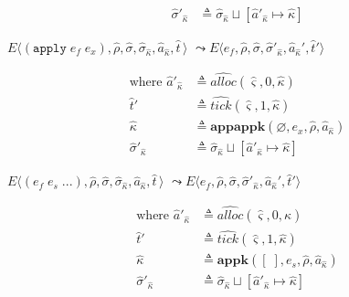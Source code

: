 \documentclass[12pt,draft]{article}
\newcommand{\applysyn}[2]{(\texttt{apply}\;#1\;#2)}
\begin{document}
{\begin{multicols*}{2}
\begin{align*}
  \hat{\sigma}'_{\hat{\kappa}} &\triangleq \hat{\sigma}_{\hat{\kappa}} \sqcup [\hat{a}'_{\hat{\kappa}} \mapsto \hat{\kappa}]
\end{align*}
\begin{center}
  $E\langle \applysyn{e_f}{e_x} , \hat{\rho} , \hat{\sigma} , \hat{\sigma}_{\hat{\kappa}} , \hat{a}_{\hat{\kappa}} , \hat{t}\,\rangle$
  $\leadsto E\langle e_f , \hat{\rho} , \hat{\sigma} , \hat{\sigma}'_{\hat{\kappa}} , \hat{a}_{\hat{\kappa}}' , \hat{t}'\rangle$
\end{center}
\vspace{-7mm}
\begin{align*}
  \text{where } \hat{a}'_{\hat{\kappa}} &\triangleq \widehat{alloc}(\hat{\varsigma}, 0, \hat{\kappa}) \\
  \hat{t}' &\triangleq \widehat{tick}(\hat{\varsigma}, 1, \hat{\kappa}) \\
  \hat{\kappa} &\triangleq \textbf{appappk}(\varnothing , e_x , \hat{\rho}, \hat{a}_{\hat{\kappa}}) \\
\hat{\sigma}'_{\hat{\kappa}} &\triangleq \hat{\sigma}_{\hat{\kappa}} \sqcup [\hat{a}'_{\hat{\kappa}} \mapsto \hat{\kappa}]
\end{align*}
\begin{center}
  $E\langle (e_f\;e_s\;...) , \hat{\rho} , \hat{\sigma} , \hat{\sigma}_{\hat{\kappa}} , \hat{a}_{\hat{\kappa}} , \hat{t}\,\rangle$
  $\leadsto E\langle e_f , \hat{\rho} , \hat{\sigma} , \hat{\sigma}'_{\hat{\kappa}} , \hat{a}_{\hat{\kappa}}' , \hat{t}'\rangle$
\end{center}
\vspace{-7mm}
\begin{align*}
  \text{where } \hat{a}'_{\hat{\kappa}} &\triangleq \widehat{alloc}(\hat{\varsigma}, 0, \hat{\kappa}) \\
  \hat{t}' &\triangleq \widehat{tick}(\hat{\varsigma}, 1, \hat{\kappa}) \\
  \hat{\kappa} &\triangleq \textbf{appk}([\;],  e_s , \hat{\rho}, \hat{a}_{\hat{\kappa}}) \\
  \hat{\sigma}'_{\hat{\kappa}} &\triangleq \hat{\sigma}_{\hat{\kappa}} \sqcup [\hat{a}'_{\hat{\kappa}} \mapsto \hat{\kappa}]
\end{align*}
\end{multicols*}
}

\newpage
\end{document}
